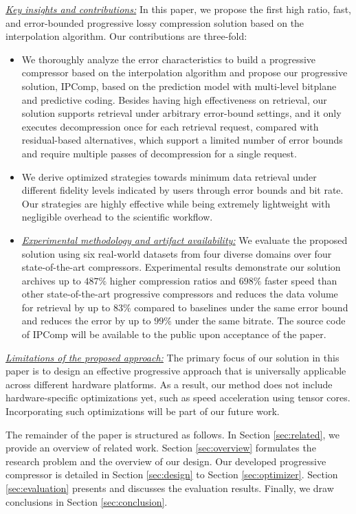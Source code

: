 \textit{\underline{Key insights and contributions:}}
In this paper, we propose the first high ratio, fast, and error-bounded progressive lossy compression solution based on the interpolation algorithm. Our contributions are three-fold:
\begin{itemize}
\item We thoroughly analyze the error characteristics to build a progressive compressor based on the interpolation algorithm and propose our progressive solution, IPComp, based on the prediction model with multi-level bitplane and predictive coding. Besides having high effectiveness on retrieval, our solution supports retrieval under arbitrary error-bound settings, and it only executes decompression once for each retrieval request, compared with residual-based alternatives, which support a limited number of error bounds and require multiple passes of decompression for a single request.
\item We derive optimized strategies towards minimum data retrieval under different fidelity levels indicated by users through error bounds and bit rate. Our strategies are highly effective while being extremely lightweight with negligible overhead to the scientific workflow.
\item \textit{\underline{Experimental methodology and artifact availability:}} We evaluate the proposed solution using six real-world datasets from four diverse domains over four state-of-the-art compressors. Experimental results demonstrate our solution archives up to $487\%$ higher compression ratios and $698\%$ faster speed than other state-of-the-art progressive compressors and reduces the data volume for retrieval by up to $83\%$ compared to baselines under the same error bound and reduces the error by up to $99\%$ under the same bitrate. The source code of IPComp will be available to the public upon acceptance of the paper.
\end{itemize}

\textit{\underline{Limitations of the proposed approach:}}  
The primary focus of our solution in this paper is to design an effective progressive approach that is universally applicable across different hardware platforms. As a result, our method does not include hardware-specific optimizations yet, such as speed acceleration using tensor cores. Incorporating such optimizations will be part of our future work.

The remainder of the paper is structured as follows. In Section \ref{sec:related}, we provide an overview of related work. Section \ref{sec:overview} formulates the research problem and the overview of our design. Our developed progressive compressor is detailed in Section \ref{sec:design} to Section \ref{sec:optimizer}. Section \ref{sec:evaluation} presents and discusses the evaluation results. Finally, we draw conclusions in Section \ref{sec:conclusion}.

